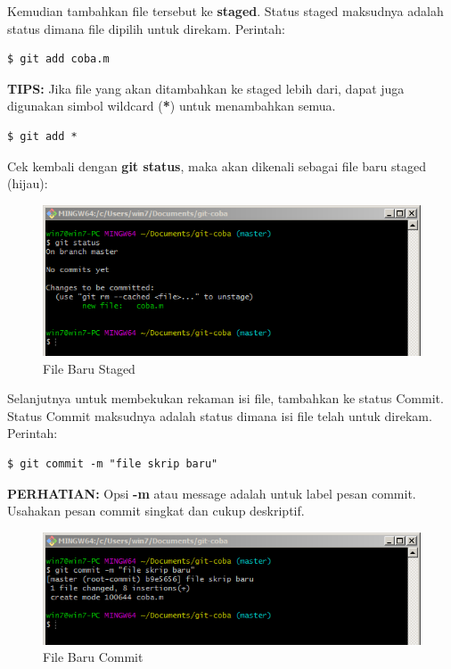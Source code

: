 \documentclass[12pt]{book}
\begin{document}
	Kemudian tambahkan file tersebut ke \textbf{staged}.
	Status staged maksudnya adalah status dimana file dipilih untuk direkam.
	Perintah:
	\begin{verbatim}
$ git add coba.m
	\end{verbatim}

	\textbf{TIPS:} Jika file yang akan ditambahkan ke staged lebih dari,
	dapat juga digunakan simbol wildcard (\textbf{*}) untuk menambahkan semua.
	\begin{verbatim}
$ git add *
	\end{verbatim}

	Cek kembali dengan \textbf{git status}, maka akan dikenali sebagai file baru staged (hijau):

	\begin{figure}[!ht]
		\centering
		\includegraphics[width=400pt]{images/git4}
		\caption{File Baru Staged}
	\end{figure}

	Selanjutnya untuk membekukan rekaman isi file, tambahkan ke status Commit.
	Status Commit maksudnya adalah status dimana isi file telah untuk direkam.
	Perintah:
	\begin{verbatim}
$ git commit -m "file skrip baru"
	\end{verbatim}

	\textbf{PERHATIAN:} Opsi \textbf{-m} atau message adalah untuk label pesan commit.
	Usahakan pesan commit singkat dan cukup deskriptif.

	\begin{figure}[!ht]
		\centering
		\includegraphics[width=400pt]{images/git5}
		\caption{File Baru Commit}
	\end{figure}
\end{document}
